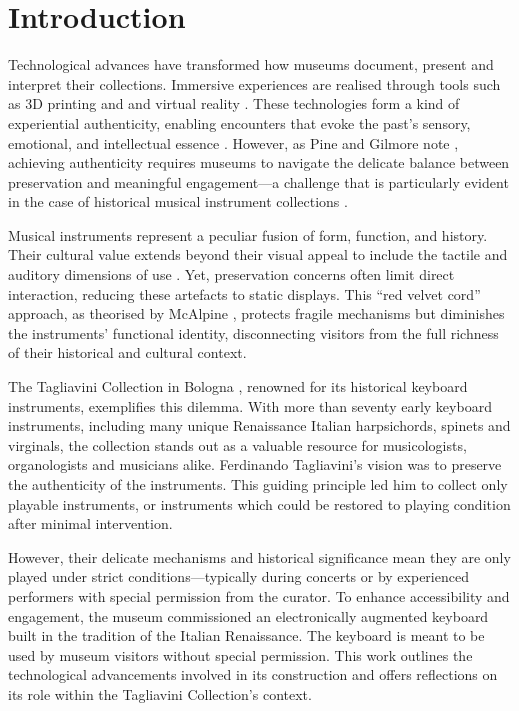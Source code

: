 \section{Introduction}\label{introduction}

Technological advances have transformed how museums document, present and interpret their collections. Immersive experiences are realised through tools such as 3D printing and and virtual reality \cite{allard2005use,Wachowiak01082009,RCM_2024_3D,Kuzminsky_LaserScan_2012,Schaich_3D_2007}. These technologies form a kind of experiential authenticity, enabling encounters that evoke the past's sensory, emotional, and intellectual essence \cite{trant_Auth_1999}. However, as Pine and Gilmore note \cite{pinegilmore_2007}, achieving authenticity requires museums to navigate the delicate balance between preservation and meaningful engagement—a challenge that is particularly evident in the case of historical musical instrument collections \cite{McAlpine2014}.

Musical instruments represent a peculiar fusion of form, function, and history. Their cultural value extends beyond their visual appeal to include the tactile and auditory dimensions of use \cite{Fritz2017}. Yet, preservation concerns often limit direct interaction, reducing these artefacts to static displays. This ``red velvet cord'' approach, as theorised by McAlpine \cite{McAlpine2014}, protects fragile mechanisms but diminishes the instruments’ functional identity, disconnecting visitors from the full richness of their historical and cultural context.

The Tagliavini Collection in Bologna \cite{Tagliavini2007}, renowned for its historical keyboard instruments, exemplifies this dilemma. With more than seventy early keyboard instruments, including many unique Renaissance Italian harpsichords, spinets and virginals, the collection stands out as a valuable resource for musicologists, organologists and musicians alike. Ferdinando Tagliavini’s vision was to preserve the authenticity of the instruments. This guiding principle led him to collect only playable instruments, or instruments which could be restored to playing condition after minimal intervention. 

However, their delicate mechanisms and historical significance mean they are only played under strict conditions—typically during concerts or by experienced performers with special permission from the curator. To enhance accessibility and engagement, the museum commissioned an electronically augmented keyboard built in the tradition of the Italian Renaissance. The keyboard is meant to be used by museum visitors without special permission. This work outlines the technological advancements involved in its construction and offers reflections on its role within the Tagliavini Collection’s context.





